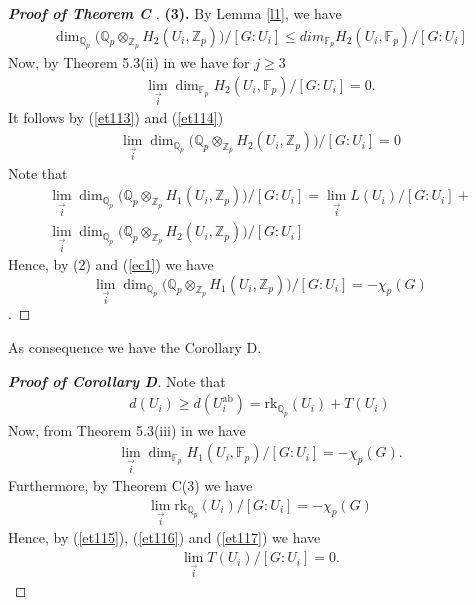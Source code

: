 \documentclass[10pt]{amsart}
\theoremstyle{plain}
\theoremstyle{definition}
\theoremstyle{remark}
\numberwithin{prop}{section}
\numberwithin{example}{section}
\numberwithin{equation}{section}
\newcommand{\Z}{\mathbb{Z}}
\newcommand{\Q}{\mathbb{Q}}
\newcommand{\F}{\mathbb{F}}
\newcommand{\rk}{\mathrm{rk}}
\newcommand{\ab}{\mathrm{ab}}
\begin{document}
\begin{proof}[\textbf{Proof of Theorem C} ]
			\item[\textbf{(3).}]  By  Lemma \ref{l1}, we have   
			\begin{align}\label{et113}
				\dim_{\Q_p}(\Q_p\otimes_{\Z_p}H_{2}(U_i,\Z_p)\big)/[G:U_i]\leq dim_{\F_p}H_2(U_i,\F_p)/[G:U_i]
			\end{align}
			Now, by Theorem  5.3(ii) in \cite{AC} we have for $j\geq 3$
			\begin{align}\label{et114}
				\displaystyle\lim_{\overrightarrow{i}}{\dim_{\F_p}H_2(U_i,\F_p)/[G:U_i]} =0.
			\end{align}
			It follows  by (\ref{et113}) and (\ref{et114}) 
			\begin{align}\label{ec1}
				\displaystyle\lim_{\overrightarrow{i}}{\dim_{\Q_p}(\Q_p\otimes_{\Z_p}H_{2}(U_i,\Z_p)\big)/[G:U_i]} =0
			\end{align}
			Note that 
			\begin{align}
				\displaystyle\lim_{\overrightarrow{i}}{\dim_{\Q_p}{\big(\Q_p\otimes_{\Z_p}H_1(U_i,\Z_p)\big)}/[G:U_i]}=\lim_{\overrightarrow{i}}{L(U_i)/[G:U_i]} +\nonumber\\ \displaystyle\lim_{\overrightarrow{i}}{\dim_{\Q_p}(\Q_p\otimes_{\Z_p}H_{2}(U_i,\Z_p)\big)/[G:U_i]}
			\end{align}
			Hence, by (2) and  (\ref{ec1}) we have  
			$$\displaystyle\lim_{\overrightarrow{i}}{\dim_{\Q_p}{\big(\Q_p\otimes_{\Z_p}H_1(U_i,\Z_p)\big)}/[G:U_i]}=-\chi_p(G)$$.
		
	\end{proof}
	As consequence  we have the  Corollary D. 
	\begin{proof}[\textbf{Proof of Corollary D}]
		Note that 
		\begin{align}\label{et115}
			d(U_i)\geq d(U_i^{\ab})=\rk_{\Q_p}(U_i)+T(U_i) 
		\end{align}
		Now, from Theorem  5.3(iii) in \cite{AC} we have 
		\begin{align}\label{et116}
			\displaystyle\lim_{\overrightarrow{i}}{\dim_{\F_p}H_1(U_i,\F_p)/[G:U_i]} =-\chi_p(G).
		\end{align}
		Furthermore, by Theorem  C(3) we have 
		\begin{align}\label{et117}
			\displaystyle\lim_{\overrightarrow{i}}{{\rk_{\Q_p}(U_i)}/[G:U_i]}=-\chi_p(G) 
		\end{align}
		Hence, by (\ref{et115}), (\ref{et116}) and (\ref{et117}) we have 
		\begin{align}
			\displaystyle\lim_{\overrightarrow{i}}{T(U_i)}/[G:U_i]=0.
		\end{align}
	\end{proof}
\end{document}

